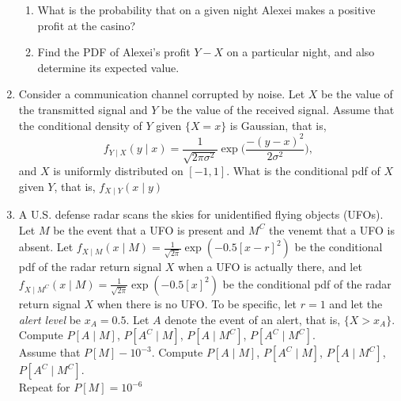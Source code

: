 \documentclass[paper=usletter, fontsize=12pt]{article}
\begin{document}
\begin{enumerate}
\begin{enumerate}
            \item What is the probability that on a given night Alexei makes a
            positive profit at the casino?

            \item Find the PDF of Alexei's profit $Y-X$ on a particular night,
            and also determine its expected value.

        \end{enumerate}

        \item Consider a communication channel corrupted by noise. Let $X$ be
        the value of the transmitted signal and $Y$ be the value of the
        received signal. Assume that the conditional density of $Y$ given
        $\{X=x\}$ is Gaussian, that is,
        \begin{equation*}
            f_{Y \mid X}(y \mid x) = \frac{1}{\sqrt{2\pi\sigma^2}}\exp\bigg(\frac{-(y-x)^2}{2\sigma^2}\bigg),
        \end{equation*}
        and $X$ is uniformly distributed on $[-1,1]$. What is the conditional
        pdf of $X$ given $Y$, that is, $f_{X \mid Y}(x \mid y)$

        \item A U.S. defense radar scans the skies for unidentified flying
        objects (UFOs). Let $M$ be the event that a UFO is present and $M^C$
        the venemt that a UFO is absent. Let $f_{X \mid M}(x \mid
        M)=\frac{1}{\sqrt{2\pi}}\exp(-0.5[x-r]^2)$ be the conditional pdf of
        the radar return signal $X$ when a UFO is actually there, and let $f_{X
        \mid M^C}(x \mid M)=\frac{1}{\sqrt{2\pi}}\exp(-0.5[x]^2)$ be the
        conditional pdf of the radar return signal $X$ when there is no UFO. To
        be specific, let $r=1$ and let the \textit{alert level} be $x_A=0.5$.
        Let $A$ denote the event of an alert, that is, $\{X>x_A\}$. Compute
        $P[A\mid M]$, $P[A^C\mid M]$, $P[A\mid M^C]$, $P[A^C\mid M^C]$.\\
        Assume that $P[M]-10^{-3}$. Compute $P[A\mid M]$, $P[A^C\mid M]$,
        $P[A\mid M^C]$, $P[A^C\mid M^C]$.\\
        Repeat for $P[M]=10^{-6}$

    \end{enumerate}
\end{document}
